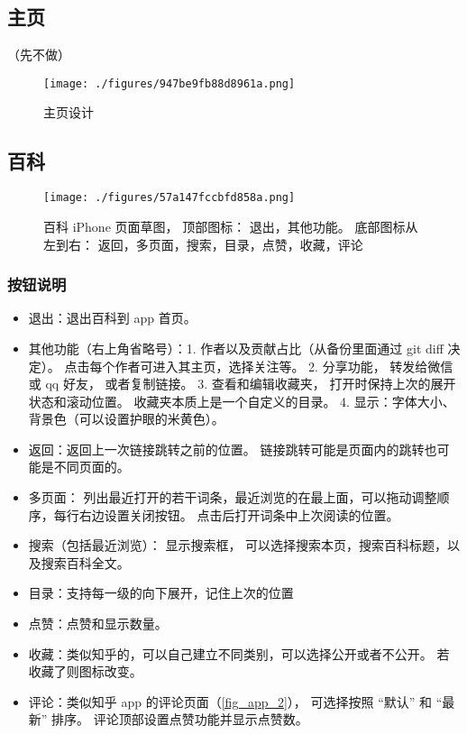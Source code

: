 
\begin{issues}
\issueDraft
\end{issues}

\subsection{主页}

（先不做）
\begin{figure}[ht]
\centering
\texttt{[image: ./figures/947be9fb88d8961a.png]}
\caption{主页设计} \label{fig_app_3}
\end{figure}

\subsection{百科}
\begin{figure}[ht]
\centering
\texttt{[image: ./figures/57a147fccbfd858a.png]}
\caption{百科 iPhone 页面草图， 顶部图标： 退出，其他功能。 底部图标从左到右： 返回，多页面，搜索，目录，点赞，收藏，评论}\label{fig_app_1}
\end{figure}

\subsubsection{按钮说明}
\begin{itemize}
\item 退出：退出百科到 app 首页。
\item 其他功能（右上角省略号）：1. 作者以及贡献占比（从备份里面通过 git diff 决定）。 点击每个作者可进入其主页，选择关注等。 2. 分享功能， 转发给微信或 qq 好友， 或者复制链接。 3. 查看和编辑收藏夹， 打开时保持上次的展开状态和滚动位置。 收藏夹本质上是一个自定义的目录。 4. 显示：字体大小、 背景色（可以设置护眼的米黄色）。
\item 返回：返回上一次链接跳转之前的位置。 链接跳转可能是页面内的跳转也可能是不同页面的。
\item 多页面： 列出最近打开的若干词条，最近浏览的在最上面，可以拖动调整顺序，每行右边设置关闭按钮。 点击后打开词条中上次阅读的位置。
\item 搜索（包括最近浏览）： 显示搜索框， 可以选择搜索本页，搜索百科标题，以及搜索百科全文。
\item 目录：支持每一级的向下展开，记住上次的位置
\item 点赞：点赞和显示数量。
\item 收藏：类似知乎的，可以自己建立不同类别，可以选择公开或者不公开。 若收藏了则图标改变。
\item 评论：类似知乎 app 的评论页面（\autoref{fig_app_2}）， 可选择按照 “默认” 和 “最新” 排序。 评论顶部设置点赞功能并显示点赞数。
\end{itemize}

